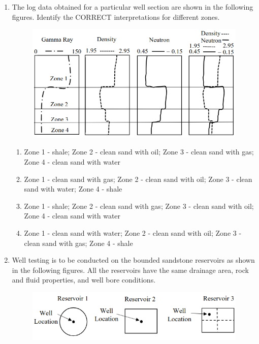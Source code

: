 \documentclass[journal,12pt,onecolumn]{IEEEtran}
\theoremstyle{remark}
\begin{document}
\begin{enumerate}
\item The log data obtained for a particular well section are shown in the following figures.
Identify the CORRECT interpretations for different zones.

\begin{figure}[h!]
  \centering
  \includegraphics[width=0.6\columnwidth]{figs/fig9.png} 
   \caption*{}
  \label{fig:Q42}
\end{figure}

\hfill{}

\begin{enumerate}
\item Zone 1 - shale; Zone 2 - clean sand with oil; Zone 3 - clean sand with gas; Zone 4 - clean sand with water
\item Zone 1 - clean sand with gas; Zone 2 - clean sand with oil; Zone 3 - clean sand with water; Zone 4 - shale
\item Zone 1 - shale; Zone 2 - clean sand with gas; Zone 3 - clean sand with oil; Zone 4 - clean sand with water
\item Zone 1 - clean sand with water; Zone 2 - clean sand with oil; Zone 3 - clean sand with gas; Zone 4 - shale
\end{enumerate}

\pagebreak

\item Well testing is to be conducted on the bounded sandstone reservoirs as shown in the following figures. All the reservoirs have the same drainage area, rock and fluid properties, and well bore conditions.

\begin{figure}[h!]
  \centering
  \includegraphics[width=0.8\columnwidth]{figs/fig10.png} 
   \caption*{}
  \label{fig:Q43}
\end{figure}


\end{enumerate}
\end{document}
